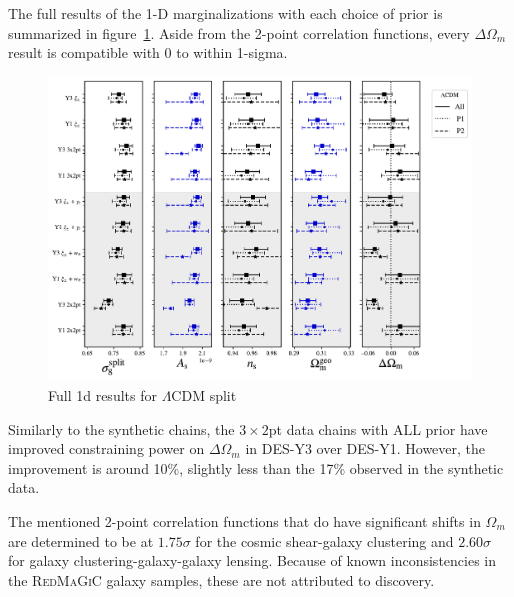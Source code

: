 The full results of the 1-D marginalizations with each choice of prior is summarized in figure~\ref{fig:lcdm_result_1d}. Aside from the 2-point correlation functions, every $\Delta\Omega_m$ result is compatible with 0 to within 1-sigma.
\begin{figure}[ht]
	\centering
	\includegraphics[width=\textwidth]{plots/plot_1d_resultv5.pdf}
	\caption{Full 1d results for $\Lambda$CDM split}
	\label{fig:lcdm_result_1d}
\end{figure}
Similarly to the synthetic chains, the $3\times2$pt data chains with ALL prior have improved constraining power on $\Delta\Omega_m$ in DES-Y3 over DES-Y1. However, the improvement is around 10\%, slightly less than the 17\% observed in the synthetic data. 

The mentioned 2-point correlation functions that do have significant shifts in $\Omega_m$ are determined to be at $1.75\sigma$ for the cosmic shear-galaxy clustering and $2.60\sigma$ for galaxy clustering-galaxy-galaxy lensing. Because of known inconsistencies in the \textsc{RedMaGiC} galaxy samples, these are not attributed to discovery.
